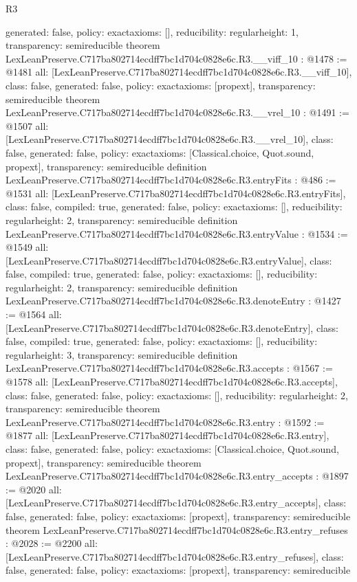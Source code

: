 \begin{lexlean}{R3}
\begin{coremodule}
{  generated: false,
  policy: exact{axioms: []},
  reducibility: regular{height: 1},
  transparency: semireducible
}
theorem LexLeanPreserve.C717ba802714ecdff7bc1d704c0828e6c.R3.__viff_10 : @1478 := @1481 {
  all: [LexLeanPreserve.C717ba802714ecdff7bc1d704c0828e6c.R3.__viff_10],
  class: false,
  generated: false,
  policy: exact{axioms: [propext]},
  transparency: semireducible
}
theorem LexLeanPreserve.C717ba802714ecdff7bc1d704c0828e6c.R3.__vrel_10 : @1491 := @1507 {
  all: [LexLeanPreserve.C717ba802714ecdff7bc1d704c0828e6c.R3.__vrel_10],
  class: false,
  generated: false,
  policy: exact{axioms: [Classical.choice, Quot.sound, propext]},
  transparency: semireducible
}
definition LexLeanPreserve.C717ba802714ecdff7bc1d704c0828e6c.R3.entryFits : @486 := @1531 {
  all: [LexLeanPreserve.C717ba802714ecdff7bc1d704c0828e6c.R3.entryFits],
  class: false,
  compiled: true,
  generated: false,
  policy: exact{axioms: []},
  reducibility: regular{height: 2},
  transparency: semireducible
}
definition LexLeanPreserve.C717ba802714ecdff7bc1d704c0828e6c.R3.entryValue : @1534 := @1549 {
  all: [LexLeanPreserve.C717ba802714ecdff7bc1d704c0828e6c.R3.entryValue],
  class: false,
  compiled: true,
  generated: false,
  policy: exact{axioms: []},
  reducibility: regular{height: 2},
  transparency: semireducible
}
definition LexLeanPreserve.C717ba802714ecdff7bc1d704c0828e6c.R3.denoteEntry : @1427 := @1564 {
  all: [LexLeanPreserve.C717ba802714ecdff7bc1d704c0828e6c.R3.denoteEntry],
  class: false,
  compiled: true,
  generated: false,
  policy: exact{axioms: []},
  reducibility: regular{height: 3},
  transparency: semireducible
}
definition LexLeanPreserve.C717ba802714ecdff7bc1d704c0828e6c.R3.accepts : @1567 := @1578 {
  all: [LexLeanPreserve.C717ba802714ecdff7bc1d704c0828e6c.R3.accepts],
  class: false,
  generated: false,
  policy: exact{axioms: []},
  reducibility: regular{height: 2},
  transparency: semireducible
}
theorem LexLeanPreserve.C717ba802714ecdff7bc1d704c0828e6c.R3.entry : @1592 := @1877 {
  all: [LexLeanPreserve.C717ba802714ecdff7bc1d704c0828e6c.R3.entry],
  class: false,
  generated: false,
  policy: exact{axioms: [Classical.choice, Quot.sound, propext]},
  transparency: semireducible
}
theorem LexLeanPreserve.C717ba802714ecdff7bc1d704c0828e6c.R3.entry_accepts : @1897 := @2020 {
  all: [LexLeanPreserve.C717ba802714ecdff7bc1d704c0828e6c.R3.entry_accepts],
  class: false,
  generated: false,
  policy: exact{axioms: [propext]},
  transparency: semireducible
}
theorem LexLeanPreserve.C717ba802714ecdff7bc1d704c0828e6c.R3.entry_refuses : @2028 := @2200 {
  all: [LexLeanPreserve.C717ba802714ecdff7bc1d704c0828e6c.R3.entry_refuses],
  class: false,
  generated: false,
  policy: exact{axioms: [propext]},
  transparency: semireducible
}


\end{coremodule}
\end{lexlean}
